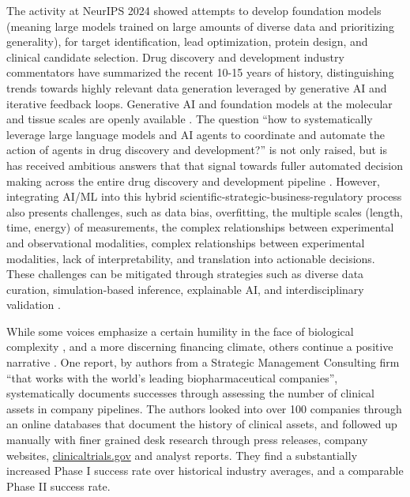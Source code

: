 The activity at NeurIPS 2024 showed attempts to develop foundation models (meaning large models trained on large amounts of diverse data and prioritizing generality), for target identification, lead optimization, protein design, and clinical candidate selection. Drug discovery and development industry commentators have summarized the recent 10-15 years of history, distinguishing trends towards highly relevant data generation leveraged by generative AI and iterative feedback loops. Generative AI and foundation models at the molecular and tissue scales are openly available \citep{Takeda2023,Ingraham2023_chroma,Wohlwend2024_boltz,Chen2024,Hayes2024,Lu2024,M.Bran2024,batatia2023foundation}.
The question ``how to systematically leverage large language models and AI agents to coordinate and automate the action of agents in drug discovery and development?'' is not only raised, but is has received ambitious answers that that signal towards fuller automated decision making across the entire drug discovery and development pipeline \citep{swanson2024virtual}. However, integrating AI/ML into this hybrid scientific-strategic-business-regulatory process also presents challenges, such as data bias, overfitting, the multiple scales (length, time, energy) of measurements, the complex relationships between experimental and observational modalities, complex relationships between experimental modalities, lack of interpretability, and translation into actionable decisions. These challenges can be mitigated through strategies such as diverse data curation, simulation-based inference, explainable AI, and interdisciplinary validation \citep{Administration2023}.

While some voices emphasize a certain humility in the face of biological complexity \citep{Castaldo2024}, and a more discerning financing climate, others continue a positive narrative \citep{Chitnis2024}. One report, by authors from a Strategic Management Consulting firm ``that works with the world’s leading biopharmaceutical companies'', systematically documents successes \citep{KPJayatunga2024} through assessing the number of clinical assets in company pipelines. The authors looked into over 100 companies through an online databases that document the history of clinical assets, and followed up manually with finer grained desk research through press releases, company websites, \url{clinicaltrials.gov} and analyst reports. They find a substantially increased Phase I success rate over historical industry averages, and a comparable Phase II success rate.

